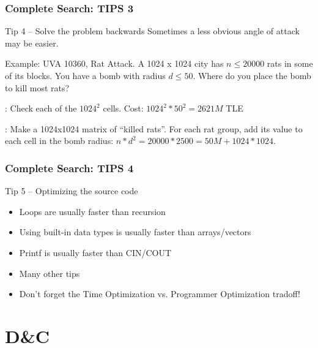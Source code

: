 \documentclass{beamer}
\begin{document}
\begin{frame}
  \frametitle{Complete Search: TIPS 3}
  {\smaller
    \begin{block}{Tip 4 -- Solve the problem backwards}
      Sometimes a less obvious angle of attack may be easier.

      \medskip

      Example: UVA 10360, Rat Attack. A 1024 x 1024 city has $n \leq 20000$ rats in
      some of its blocks. You have a bomb with radius $d \leq
      50$. Where do you place the bomb to kill most rats?

      \medskip

      : Check each of the $1024^2$
      cells. Cost: $1024^2*50^2 = 2621M$ TLE

      \medskip

      : Make a 1024x1024 matrix of
      ``killed rats''. For each rat group, add its value to each cell in the
      bomb radius: $n * d^2 = 20000*2500 = 50M + 1024*1024$.
    \end{block}

  }
\end{frame}

\begin{frame}
  \frametitle{Complete Search: TIPS 4}

  {\smaller
    \begin{block}{Tip 5 -- Optimizing the source code}
      \begin{itemize}
      \item Loops are usually faster than recursion
      \item Using built-in data types is usually faster than arrays/vectors
      \item Printf is usually faster than CIN/COUT
      \item Many other tips

        \bigskip

      \item Don't forget the Time Optimization vs. Programmer
        Optimization tradoff!
      \end{itemize}

    \end{block}
  }
\end{frame}


\section{D\&C}
\end{document}
